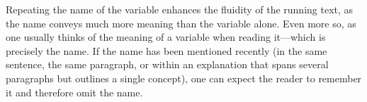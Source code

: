 


\noindent Repeating the name of the variable enhances the fluidity of the running text, as the name conveys much more meaning than the variable alone.
Even more so, as one usually thinks of the meaning of a variable when reading it---which is precisely the name.
If the name has been mentioned recently (in the same sentence, the same paragraph, or within an explanation that spans several paragraphs but outlines a single concept), one can expect the reader to remember it and therefore omit the name.

